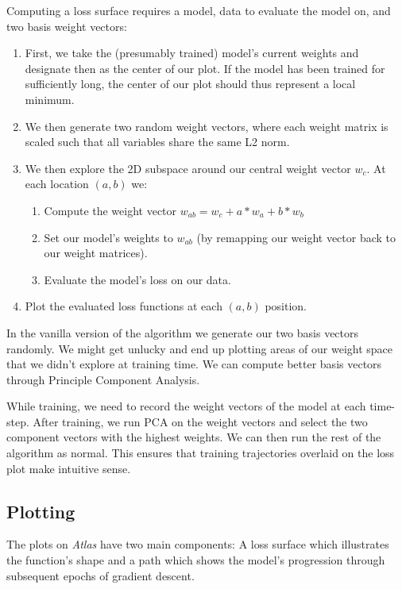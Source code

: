 \documentclass[letterpaper]{article}
\begin{document}
Computing a loss surface requires a model, data to evaluate the model on, and two basis weight vectors:
\begin{enumerate}
    \item First, we take the (presumably trained) model's current weights and designate then as the center of our plot. If the model has been trained for sufficiently long, the center of our plot should thus represent a local minimum.
    \item We then generate two random weight vectors, where each weight matrix is scaled such that all variables share the same L2 norm.
    \item We then explore the 2D subspace around our central weight vector $w_c$. At each location $(a, b)$ we:
    \begin{enumerate}
        \item Compute the weight vector $w_{ab} = w_c + a * w_a + b * w_b$
        \item Set our model's weights to $w_{ab}$ (by remapping our weight vector back to our weight matrices). 
        \item Evaluate the model's loss on our data.
    \end{enumerate}
    \item Plot the evaluated loss functions at each $(a, b)$ position.
\end{enumerate}

In the vanilla version of the algorithm we generate our two basis vectors randomly. We might get unlucky and end up plotting areas of our weight space that we didn't explore at training time. We can compute better basis vectors through Principle Component Analysis.

While training, we need to record the weight vectors of the model at each time-step. After training, we run PCA on the weight vectors and select the two component vectors with the highest weights. We can then run the rest of the algorithm as normal.  This ensures that training trajectories overlaid on the loss plot make intuitive sense.

\subsection{Plotting}
The plots on \textit{Atlas} have two main components: A loss surface which illustrates the function's shape and a path which shows the model's progression through subsequent epochs of gradient descent.
\end{document}

